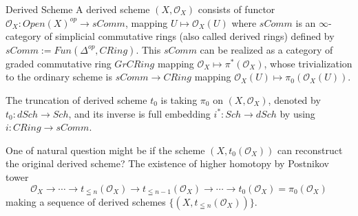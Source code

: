 \documentclass{article}
\begin{document}
\begin{definition}{Derived Scheme}{}
A derived scheme $(X,\mathcal{O}_X)$ consists of functor $\mathcal{O}_X: Open(X)^{op}\to sComm$,
mapping $U \mapsto \mathcal{O}_X(U)$ where $sComm$ is an $\infty$-category of simplicial commutative rings (also called derived rings)
defined by $sComm := Fun(\Delta^{op}, CRing)$.
This $sComm$ can be realized as a category of graded commutative ring $GrCRing$ mapping $\mathcal{O}_X \mapsto \pi^*(\mathcal{O}_X)$,
whose trivialization to the ordinary scheme is $sComm \to CRing$ mapping $\mathcal{O}_X(U) \mapsto \pi_0(\mathcal{O}_X(U))$.


\vspace{1cm}
\vspace{1cm}

The truncation of derived scheme $t_0$ is taking $\pi_0$ on $(X,\mathcal{O}_X)$, denoted by $t_0: dSch \to Sch$, 
and its inverse is full embedding $i^*:Sch \to dSch$ by using $i:CRing \to sComm$.

\vspace{1cm}
\vspace{1cm}
\end{definition}


\noindent
One of natural question might be if the scheme $(X,t_0(\mathcal{O}_X))$ can reconstruct the original derived scheme?
The existence of higher homotopy by Postnikov tower 
\[\mathcal{O}_X \to \cdots \to t_{\leqq n}(\mathcal{O}_X) \to t_{\leqq n-1}(\mathcal{O}_X) \to \cdots \to 
t_0(\mathcal{O}_X) = \pi_0(\mathcal{O}_X) \]
making a sequence of derived schemes $\{(X,t_{\leqq n}(\mathcal{O}_X)) \}$. \\
\end{document}
